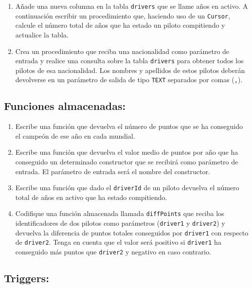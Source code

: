 \documentclass{db-practice}
\begin{document}
\begin{enumerate}
    \item Añade una nueva columna en la tabla \texttt{drivers} que se llame años en activo. A continuación escribir un procedimiento que, haciendo uso de un \texttt{Cursor}, calcule el número total de años que ha estado un piloto compitiendo y actualice la tabla.

    \item Crea un procedimiento que reciba una nacionalidad como parámetro de entrada y realice una consulta sobre la tabla \texttt{drivers} para obtener todos los pilotos de esa nacionalidad. Los nombres y apellidos de estos pilotos deberán devolverse en un parámetro de salida de tipo \texttt{TEXT} separados por comas (\texttt{,}).
\end{enumerate}

\subsection*{Funciones almacenadas:}

\begin{enumerate}
    \item Escribe una función que devuelva el número de puntos que se ha conseguido el campeón de ese año en cada mundial.
       
    \item Escribe una función que devuelva el valor medio de puntos por año que ha conseguido un determinado constructor que se recibirá como parámetro de entrada. El parámetro de entrada será el nombre del constructor.
            
    \item Escribe una función que dado el \texttt{driverId} de un piloto devuelva el número total de años en activo que ha estado compitiendo.

    \item Codifique una función almacenada llamada \texttt{diffPoints} que reciba los identificadores de dos pilotos como parámetros (\texttt{driver1} y \texttt{driver2}) y devuelva la diferencia de puntos totales conseguidos por \texttt{driver1} con respecto de \texttt{driver2}. Tenga en cuenta que el valor será positivo si \texttt{driver1} ha conseguido más puntos que \texttt{driver2} y negativo en caso contrario.
\end{enumerate}

\subsection*{Triggers:}
\end{document}
